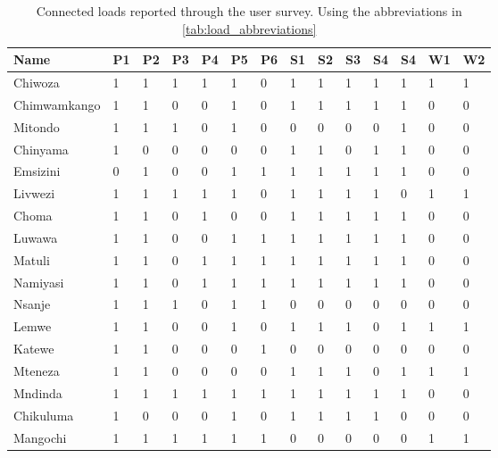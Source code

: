 \begin{table}[ht!]
\centering
    \begin{tabular}{m{3.5cm}| m{.5cm} m{.5cm} m{.5cm} m{.5cm}m{.5cm} m{.5cm} m{.5cm} m{.5cm}m{.5cm} m{.5cm} m{.5cm}m{.6cm}m{.6cm} |} 
    \toprule
    \toprule
    \textbf{Name}&\textbf{P1}&\textbf{P2}&\textbf{P3}& \textbf{P4}&\textbf{P5} &\textbf{P6}& 
    \textbf{S1}&\textbf{S2}&\textbf{S3}&\textbf{S4}&\textbf{S4}&
    \textbf{W1}&\textbf{W2}\\
    \midrule
    Chiwoza         & 1 & 1 & 1 & 1 & 1 & 0 & 1 & 1 & 1 & 1 & 1 & 1 & 1\\
    \hline
    Chimwamkango    & 1 & 1 & 0 & 0 & 1 & 0 & 1 & 1 & 1 & 1 & 1 & 0 & 0\\
    \hline
    Mitondo         & 1 & 1 & 1 & 0 & 1 & 0 & 0 & 0 & 0 & 0 & 1 & 0 & 0\\
    \hline
    Chinyama        & 1 & 0 & 0 & 0 & 0 & 0 & 1 & 1 & 0 & 1 & 1 & 0 & 0\\
    \hline
    Emsizini        & 0 & 1 & 0 & 0 & 1 & 1 & 1 & 1 & 1 & 1 & 1 & 0 & 0\\
    \hline
    Livwezi         & 1 & 1 & 1 & 1 & 1 & 0 & 1 & 1 & 1 & 1 & 0 & 1 & 1\\
    \hline
    Choma           & 1 & 1 & 0 & 1 & 0 & 0 & 1 & 1 & 1 & 1 & 1 & 0 & 0\\
    \hline
    Luwawa          & 1 & 1 & 0 & 0 & 1 & 1 & 1 & 1 & 1 & 1 & 1 &  0 & 0\\
    \hline
    Matuli          & 1 & 1 & 0 & 1 & 1 & 1 & 1 & 1 & 1 & 1 & 1 & 0 & 0\\
    \hline
    Namiyasi        & 1 & 1 & 0 & 1 & 1 & 1 & 1 & 1 & 1 & 1 & 1 & 0 & 0\\
    \hline
    Nsanje          & 1 & 1 & 1 & 0 & 1 & 1 & 0 & 0 & 0 & 0 & 0 & 0 & 0\\
    \hline
    Lemwe           & 1 & 1 & 0 & 0 & 1 & 0 & 1 & 1 & 1 & 0 & 1 & 1 & 1\\
    \hline
    Katewe          & 1 & 1 & 0 & 0 & 0 & 1 & 0 & 0 & 0 & 0 & 0 & 0 & 0\\
    \hline
    Mteneza         & 1 & 1 & 0 & 0 & 0 & 0 & 1 & 1 & 1 & 0 & 1 & 1 & 1\\
    \hline
    Mndinda         & 1 & 1 & 1 & 1 & 1 & 1 & 1 & 1 & 1 & 1 & 1 & 0 & 0\\
    \hline
    Chikuluma       & 1 & 0 & 0 & 0 & 1 & 0 & 1 & 1 & 1 & 1 & 0 & 0 & 0\\
    \hline
    Mangochi        & 1 & 1 & 1 & 1 & 1 & 1 & 0 & 0 & 0 & 0 & 0 & 1 & 1\\
    
    \bottomrule
    \bottomrule
    \end{tabular}
\caption[User survey- Connected loads]{Connected loads reported through the user survey. Using the abbreviations in \ref{tab:load_abbreviations}}
\label{tab:connected_loads}
\end{table}

